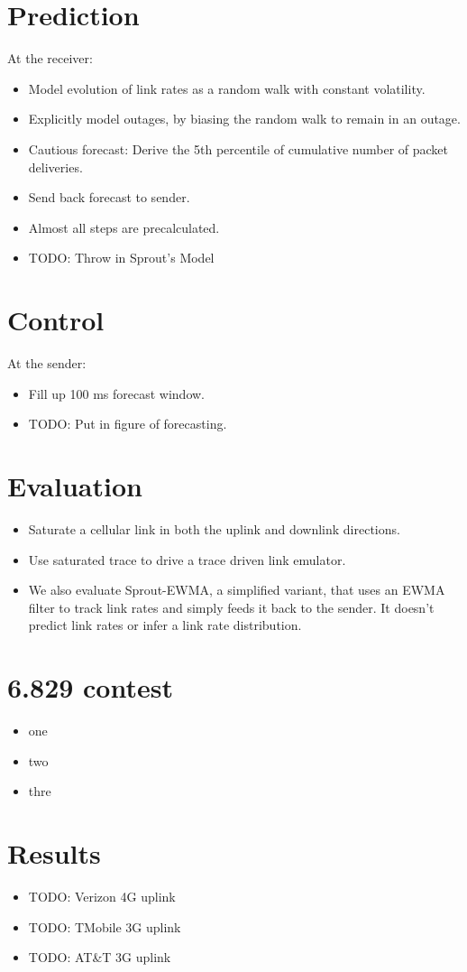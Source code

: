 \begin{multicols}{2}
\section*{Prediction}
At the receiver:
\begin{itemize}
\item Model evolution of link rates as a random walk with constant volatility.
\item Explicitly model outages, by biasing the random walk to remain in an outage.
\item Cautious forecast: Derive the 5th percentile of cumulative number of packet deliveries.
\item Send back forecast to sender.
\item Almost all steps are precalculated.
\item TODO: Throw in Sprout's Model
\end{itemize}

\section*{Control}
At the sender:
\begin{itemize}
\item Fill up 100 ms forecast window.
\item TODO: Put in figure of forecasting.
\end{itemize}

\section*{Evaluation}
\begin{itemize}
\item Saturate a cellular link in both the uplink and downlink directions.
\item Use saturated trace to drive a trace driven link emulator.
\item We also evaluate Sprout-EWMA, a simplified variant, that uses an EWMA filter to track link rates and simply feeds it back to the sender. It doesn't predict link rates or infer a link rate distribution.
\end{itemize}

\section*{6.829 contest}
\begin{itemize}
\item one
\item two
\item thre
\end{itemize}

\section*{Results}
\begin{itemize}
\item TODO: Verizon 4G uplink
\item TODO: TMobile 3G uplink
\item TODO: AT\&T 3G uplink
\end{itemize}


\end{multicols}
